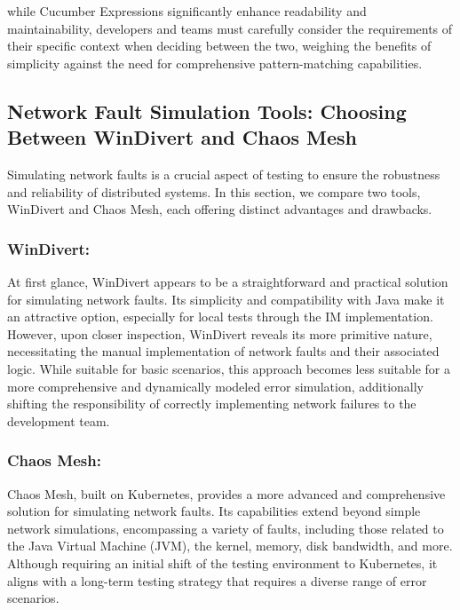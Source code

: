 while Cucumber Expressions significantly enhance readability and maintainability, developers and teams must carefully consider the requirements of their specific context when deciding between the two, weighing the benefits of simplicity against the need for comprehensive pattern-matching capabilities.





\subsection{Network Fault Simulation Tools: Choosing Between WinDivert and Chaos Mesh}
\label{subsec:network-fault-wdiviert-chaos-mesh}
Simulating network faults is a crucial aspect of testing to ensure the robustness and reliability of distributed systems. In this section, we compare two tools, WinDivert and Chaos Mesh, each offering distinct advantages and drawbacks.

\subsubsection{WinDivert:}
At first glance, WinDivert appears to be a straightforward and practical solution for simulating network faults. Its simplicity and compatibility with Java make it an attractive option, especially for local tests through the \ac{IM} implementation. However, upon closer inspection, WinDivert reveals its more primitive nature, necessitating the manual implementation of network faults and their associated logic. While suitable for basic scenarios, this approach becomes less suitable for a more comprehensive and dynamically modeled error simulation, additionally shifting the responsibility of correctly implementing network failures to the development team.

\subsubsection{Chaos Mesh:}
Chaos Mesh, built on Kubernetes, provides a more advanced and comprehensive solution for simulating network faults. Its capabilities extend beyond simple network simulations, encompassing a variety of faults, including those related to the Java Virtual Machine (JVM), the kernel, memory, disk bandwidth, and more. Although requiring an initial shift of the testing environment to Kubernetes, it aligns with a long-term testing strategy that requires a diverse range of error scenarios.

